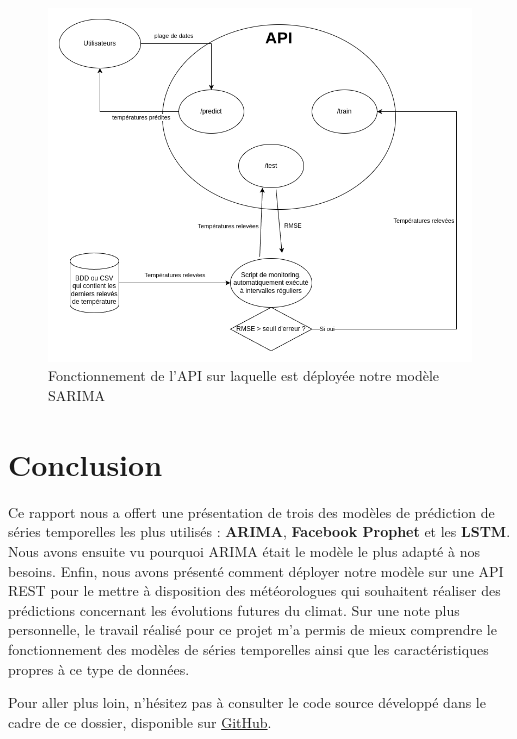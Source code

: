 \documentclass[french]{article}
\begin{document}
    \begin{figure}[h]
        \includegraphics[width=12cm]{schema_API_E2}
        \centering
        \caption{Fonctionnement de l'API sur laquelle est déployée notre modèle SARIMA}
        \centering
    \end{figure}

    \newpage
    \section*{Conclusion}
    Ce rapport nous a offert une présentation de trois des modèles de prédiction de séries temporelles les plus utilisés : \textbf{ARIMA}, \textbf{Facebook Prophet} et les \textbf{LSTM}. Nous avons ensuite vu pourquoi ARIMA était le modèle le plus adapté à nos besoins. Enfin, nous avons présenté comment déployer notre modèle sur une API REST pour le mettre à disposition des météorologues qui souhaitent réaliser des prédictions concernant les évolutions futures du climat.
    Sur une note plus personnelle, le travail réalisé pour ce projet m'a permis de mieux comprendre le fonctionnement des modèles de séries temporelles ainsi que les caractéristiques propres à ce type de données.

    Pour aller plus loin, n'hésitez pas à consulter le code source développé dans le cadre de ce dossier, disponible sur \href{https://github.com/vinpap/predict_climate_change}{GitHub}.

\end{document}
